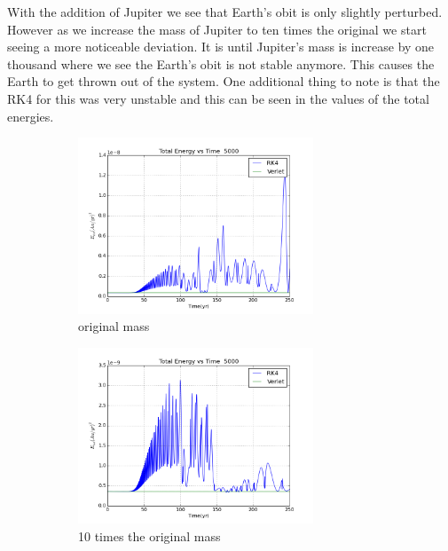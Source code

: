 \documentclass[11pt,a4wide]{article}
\begin{document}

	With the addition of Jupiter we see that Earth's obit is only slightly perturbed. However as we increase the mass of Jupiter to ten times the original we start seeing a more noticeable deviation. It is until Jupiter's mass is increase by one thousand where we see the Earth's obit is not stable anymore. This causes the Earth to get thrown out of the system. One additional thing to note is that the RK4 for this was very unstable and this can be seen in the values of the total energies.

\begin{figure}[H]
\begin{subfigure}[b]{0.5\linewidth}
    \centering
    \includegraphics[width=70mm]{Energy_EJ.png}
    \caption{original mass } 
    \label{fig7:a} 
    \vspace{4ex}
\end{subfigure}%
\begin{subfigure}[b]{0.5\linewidth}
    \centering
    \includegraphics[width=70mm]{Energy_EJ10.png}
    \caption{10 times the original mass} 
    \label{fig7:b} 
    \vspace{4ex}
\end{subfigure}
\begin{subfigure}[b]{0.5\linewidth}

\end{subfigure}
\end{figure}
\end{document}
